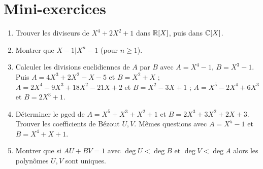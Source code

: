 % 
% 
% 
% 
% 
% 
% 
% 
% 
% 


\section{Mini-exercices}

\begin{frame}

\begin{miniexercice}
\begin{enumerate}
  \item Trouver les diviseurs de $X^4+2X^2+1$ dans $\mathbb{R}[X]$, puis dans $\mathbb{C}[X]$.

  \item Montrer que $X-1|X^n-1$ (pour $n\ge 1$).

  \item Calculer les divisions euclidiennes de $A$ par $B$ avec $A=X^4-1$, $B=X^3-1$.
Puis $A = 4X^3+2X^2-X-5$ et $B = X^2+X$ ; $A= 2X^4-9X^3+18X^2-21X+2$ et $B=X^2-3X+1$ ;
$A=X^ 5-2X^4+6X^3$ et $B=2X^3+1$.

  \item Déterminer le pgcd de $A=X^5+X^3+X^2+1$ et $B=2X^3+3X^2+2X+3$.
Trouver les coefficients de Bézout $U,V$.
Mêmes questions avec $A=X^5-1$ et $B=X^4+X+1$.

  \item Montrer que si $AU+BV=1$ avec $\deg U < \deg B$ et $\deg V < \deg A$ 
  alors les polynômes $U,V$ sont uniques.
\end{enumerate}
\end{miniexercice}

\end{frame}

